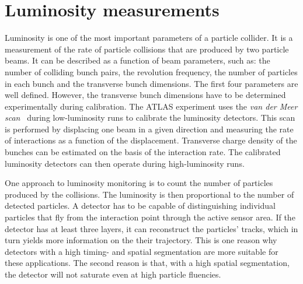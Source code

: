 \documentclass[twoside,12pt]{packages/mytustyle}  %
\begin{document}
\section{Luminosity measurements}
\label{sec:lummeas}
 \label{sec:lumi}
Luminosity is one of the most important parameters of a particle collider. It is a measurement of the rate of particle collisions that are produced by two particle beams. It can be described as a function of beam parameters, such as: the number of colliding bunch pairs, the revolution frequency, the number of particles in each bunch and the transverse bunch dimensions. The first four parameters are well defined. However, the transverse bunch dimensions have to be determined experimentally during calibration. The ATLAS experiment uses the \emph{van der Meer scan}~\cite{} during low-luminosity runs to calibrate the luminosity detectors. This scan is performed by displacing one beam in a given direction and measuring the rate of interactions as a function of the displacement. Transverse charge density of the bunches can be estimated on the basis of the interaction rate. The calibrated luminosity detectors can then operate during high-luminosity runs.

One approach to luminosity monitoring is to count the number of particles produced by the collisions. The luminosity is then proportional to the number of detected particles. A detector has to be capable of distinguishing individual particles that fly from the interaction point through the active sensor area. If the detector has at least three layers, it can reconstruct the particles' tracks, which in turn yields more information on the their trajectory. This is one reason why detectors with a high timing- and spatial segmentation are more suitable for these applications. The second reason is that, with a high spatial segmentation, the detector will not saturate even at high particle fluencies.





\end{document}
